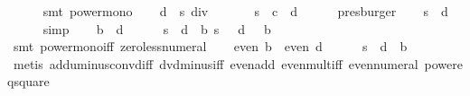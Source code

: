 \begin{isabellebody}
\ \ \ \ \isamarkupfalse%
\ {\isacharparenleft}smt\ power{\isacharunderscore}mono{\isacharparenright}\isanewline
\isanewline
\ \ \isamarkupfalse%
\ {\isachardoublequoteopen}d{\isacharcircum}{}\ {\isachargreater}\ s{\isacharcircum}{}\ div\ {}{\isachardoublequoteclose}\isanewline
\ \ \ \ \isamarkupfalse%
\ {\isacharbackquoteopen}s{\isacharcircum}{}\ {\isacharequal}\ c{\isacharcircum}{}\ {\isacharplus}\ d{\isacharcircum}{}{\isacharbackquoteclose}\isanewline
\ \ \ \ \isamarkupfalse%
\ presburger\isanewline
\isanewline
\ \ \isamarkupfalse%
\ {\isachardoublequoteopen}{}{\isacharasterisk}s{\isacharcircum}{}\ {\isacharless}\ {}{\isacharasterisk}d{\isacharcircum}{}{\isachardoublequoteclose}\isanewline
\ \ \ \ \isamarkupfalse%
\ simp\isanewline
\isanewline
\ \ \isamarkupfalse%
\ {\isachardoublequoteopen}b\ {\isacharless}\ d{\isachardoublequoteclose}\isanewline
\ \ \ \ \isamarkupfalse%
\ {\isacharbackquoteopen}{}{\isacharasterisk}s\ {\isacharequal}\ d{\isacharcircum}{}\ {\isacharminus}\ b{\isacharcircum}{}{\isacharbackquoteclose}\ {\isacharbackquoteopen}s\ {\isachargreater}\ {}{\isacharbackquoteclose}\ {\isacharbackquoteopen}d\ {\isachargreater}\ {}{\isacharbackquoteclose}\ {\isacharbackquoteopen}b\ {\isachargreater}\ {}{\isacharbackquoteclose}\isanewline
\ \ \ \ \isamarkupfalse%
\ {\isacharparenleft}smt\ power{\isacharunderscore}mono{\isacharunderscore}iff\ zero{\isacharunderscore}less{\isacharunderscore}numeral{\isacharparenright}\isanewline
\isanewline
\ \ \isamarkupfalse%
\ {\isachardoublequoteopen}even\ b\ {\isasymlongleftrightarrow}\ even\ d{\isachardoublequoteclose}\isanewline
\ \ \ \ \isamarkupfalse%
\ {\isacharbackquoteopen}{}{\isacharasterisk}s\ {\isacharequal}\ d{\isacharcircum}{}\ {\isacharminus}\ b{\isacharcircum}{}{\isacharbackquoteclose}\isanewline
\ \ \ \ \isamarkupfalse%
\ {\isacharparenleft}metis\ add{\isacharunderscore}uminus{\isacharunderscore}conv{\isacharunderscore}diff\ dvd{\isacharunderscore}minus{\isacharunderscore}iff\ even{\isacharunderscore}add\ even{\isacharunderscore}mult{\isacharunderscore}iff\ even{\isacharunderscore}numeral\ power{}{\isacharunderscore}eq{\isacharunderscore}square{\isacharparenright}\isanewline

\end{isabellebody}
